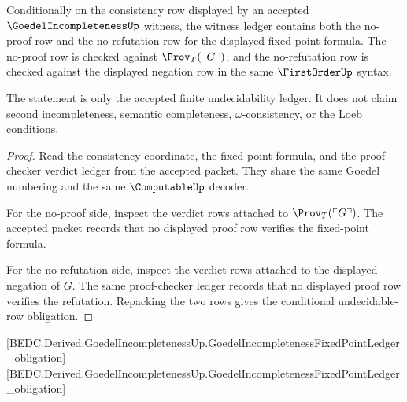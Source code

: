 \begin{theorem}
\label{thm:goedelincompleteness-undecidable-row-obligation}
Conditionally on the consistency row displayed by an accepted
$\GoedelIncompletenessUp$ witness, the witness ledger contains both the
no-proof row and the no-refutation row for the displayed fixed-point formula.
The no-proof row is checked against $\Prov_T(\ulcorner G\urcorner)$, and the
no-refutation row is checked against the displayed negation row in the same
$\FirstOrderUp$ syntax.

The statement is only the accepted finite undecidability ledger. It does not
claim second incompleteness, semantic completeness, $\omega$-consistency, or
the Loeb conditions.
\end{theorem}
\begin{proof}
Read the consistency coordinate, the fixed-point formula, and the
proof-checker verdict ledger from the accepted packet. They share the same
Goedel numbering and the same $\ComputableUp$ decoder.

For the no-proof side, inspect the verdict rows attached to
$\Prov_T(\ulcorner G\urcorner)$. The accepted packet records that no displayed
proof row verifies the fixed-point formula.

For the no-refutation side, inspect the verdict rows attached to the displayed
negation of $G$. The same proof-checker ledger records that no displayed proof
row verifies the refutation. Repacking the two rows gives the conditional
undecidable-row obligation.
\end{proof}

[BEDC.Derived.GoedelIncompletenessUp.GoedelIncompletenessFixedPointLedger\_obligation]
[BEDC.Derived.GoedelIncompletenessUp.GoedelIncompletenessFixedPointLedger\_obligation]

